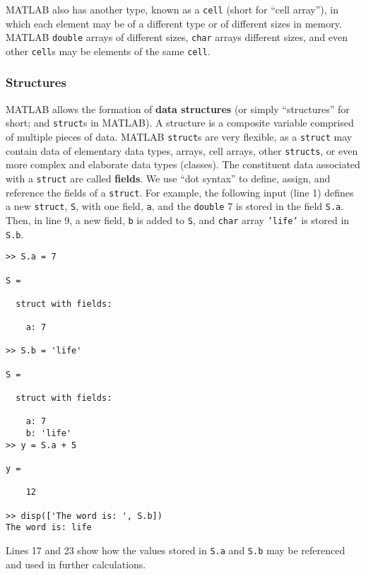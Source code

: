 MATLAB also has another type, known as a \texttt{cell} (short for ``cell array''), in which each element may be of a different type or of different sizes in memory. MATLAB \texttt{double} arrays of different sizes, \texttt{char} arrays different sizes, and even other \texttt{cell}s may be elements of the same \texttt{cell}.

\subsubsection{Structures}

MATLAB allows the formation of \textbf{data structures} (or simply ``structures'' for short; and \texttt{struct}s in MATLAB). A structure is a composite variable comprised of multiple pieces of data. MATLAB \texttt{struct}s are very flexible, as a \texttt{struct} may contain data of elementary data types, arrays, cell arrays, other \texttt{structs}, or even more complex and elaborate data types (classes). The constituent data associated with a \texttt{struct} are called \textbf{fields}. We use ``dot syntax'' to define, assign, and reference the fields of a \texttt{struct}. For example, the following input (line 1) defines a new \texttt{struct}, \texttt{S}, with one field, \texttt{a}, and the \texttt{double} 7 is stored in the field \texttt{S.a}. Then, in line 9, a new field, \texttt{b} is added to \texttt{S}, and \texttt{char} array \texttt{'life'} is stored in \texttt{S.b}.
\begin{lstlisting}[style=Matlab-editor]
>> S.a = 7

S = 

  struct with fields:

    a: 7

>> S.b = 'life'

S = 

  struct with fields:

    a: 7
    b: 'life'
>> y = S.a + 5

y =

    12

>> disp(['The word is: ', S.b])
The word is: life
\end{lstlisting}
Lines 17 and 23 show how the values stored in \texttt{S.a} and \texttt{S.b} may be referenced and used in further calculations.

